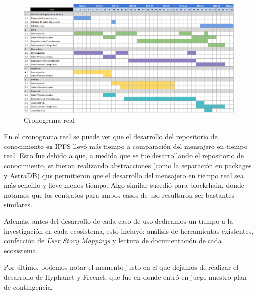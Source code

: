 \begin{figure}[H]
    \centering
    \includegraphics[width=1\linewidth]{img/cronograma-real.png}
    \caption{Cronograma real}
    \label{fig:cronograma-real}
\end{figure}

En el cronograma real se puede ver que el desarrollo del repositorio de conocimiento en IPFS llevó más tiempo a comparación del mensajero en tiempo real. Esto fue debido a que, a medida que se fue desarrollando el repositorio de conocimiento, se fueron realizando abstracciones (como la separación en packages y AstraDB) que permitieron que el desarrollo del mensajero en tiempo real sea más sencillo y lleve menos tiempo. Algo similar sucedió para blockchain, donde notamos que los contratos para ambos casos de uso resultaron ser bastantes similares.

Además, antes del desarrollo de cada caso de uso dedicamos un tiempo a la investigación en cada ecosistema, esto incluyó: análisis de herramientas existentes, confección de \textit{User Story Mappings} y lectura de documentación de cada ecosistema.

Por último, podemos notar el momento justo en el que dejamos de realizar el desarrollo de Hyphanet y Freenet, que fue en donde entró en juego nuestro plan de contingencia. 


    
